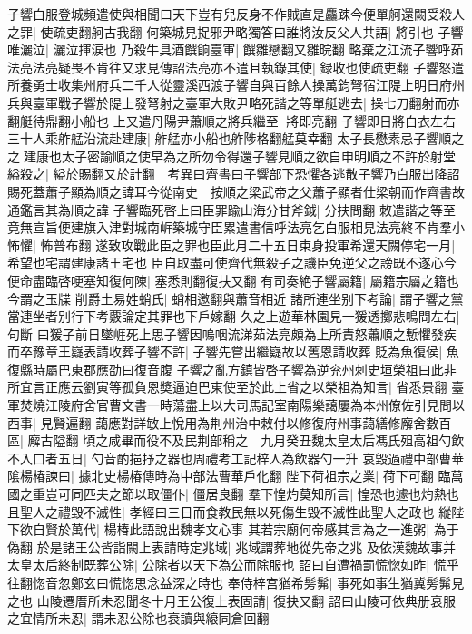 子響白服登城頻遣使與相聞曰天下豈有兒反身不作賊直是麤踈今便單舸還闕受殺人之罪|{
	使疏吏翻舸古我翻}
何築城見捉邪尹略獨答曰誰將汝反父人共語|{
	將引也}
子響唯灑泣|{
	灑泣揮涙也}
乃殺牛具酒饌餉臺軍|{
	饌雛戀翻又雛晥翻}
略棄之江流子響呼茹法亮法亮疑畏不肯往又求見傳詔法亮亦不遣且執錄其使|{
	録收也使疏吏翻}
子響怒遣所養勇士收集州府兵二千人從靈溪西渡子響自與百餘人操萬鈞弩宿江隄上明日府州兵與臺軍戰子響於隄上發弩射之臺軍大敗尹略死諧之等單艇逃去|{
	操七刀翻射而亦翻艇待鼎翻小船也}
上又遣丹陽尹蕭順之將兵繼至|{
	將即亮翻}
子響即日將白衣左右三十人乘舴艋沿流赴建康|{
	舴艋亦小船也舴陟格翻艋莫幸翻}
太子長懋素忌子響順之之建康也太子密諭順之使早為之所勿令得還子響見順之欲自申明順之不許於射堂縊殺之|{
	縊於賜翻又於計翻　考異曰齊書曰子響部下恐懼各逃散子響乃白服出降詔賜死蓋蕭子顯為順之諱耳今從南史　按順之梁武帝之父蕭子顯者仕梁朝而作齊書故通鑑言其為順之諱}
子響臨死啓上曰臣罪踰山海分甘斧鉞|{
	分扶問翻}
敇遣諧之等至竟無宣旨便建旗入津對城南㟁築城守臣累遣書信呼法亮乞白服相見法亮終不肯羣小怖懼|{
	怖普布翻}
遂致攻戰此臣之罪也臣此月二十五日束身投軍希還天闕停宅一月|{
	希望也宅謂建康諸王宅也}
臣自取盡可使齊代無殺子之譏臣免逆父之謗既不遂心今便命盡臨啓哽塞知復何陳|{
	塞悉則翻復扶又翻}
有司奏絶子響屬籍|{
	屬籍宗屬之籍也今謂之玉牒}
削爵土易姓蛸氏|{
	蛸相邀翻與蕭音相近}
諸所連坐别下考論|{
	謂子響之黨當連坐者别行下考覈論定其罪也下戶嫁翻}
久之上遊華林園見一猨透擲悲鳴問左右|{
	句斷}
曰猨子前日墜崕死上思子響因嗚咽流涕茹法亮頗為上所責怒蕭順之慙懼發疾而卒豫章王嶷表請收葬子響不許|{
	子響先嘗出繼嶷故以舊恩請收葬}
貶為魚復侯|{
	魚復縣時屬巴東郡應劭曰復音腹}
子響之亂方鎮皆啓子響為逆兖州刺史垣榮祖曰此非所宜言正應云劉寅等孤負恩奬逼迫巴東使至於此上省之以榮祖為知言|{
	省悉景翻}
臺軍焚燒江陵府舍官曹文書一時蕩盡上以大司馬記室南陽樂藹屢為本州僚佐引見問以西事|{
	見賢遍翻}
藹應對詳敏上悅用為荆州治中敕付以修復府州事藹繕修廨舍數百區|{
	廨古隘翻}
頃之咸畢而役不及民荆部稱之　九月癸丑魏太皇太后馮氏殂高祖勺飲不入口者五日|{
	勺音酌挹抒之器也周禮考工記梓人為飲器勺一升}
哀毀過禮中部曹華隂楊椿諫曰|{
	據北史楊椿傳時為中部法曹華戶化翻}
陛下荷祖宗之業|{
	荷下可翻}
臨萬國之重豈可同匹夫之節以取僵仆|{
	僵居良翻}
羣下惶灼莫知所言|{
	惶恐也遽也灼熱也}
且聖人之禮毀不滅性|{
	孝經曰三日而食教民無以死傷生毁不滅性此聖人之政也}
縱陛下欲自賢於萬代|{
	楊椿此語說出魏孝文心事}
其若宗廟何帝感其言為之一進粥|{
	為于偽翻}
於是諸王公皆詣闕上表請時定兆域|{
	兆域謂葬地從先帝之兆}
及依漢魏故事并太皇太后終制既葬公除|{
	公除者以天下為公而除服也}
詔曰自遭禍罰慌惚如昨|{
	慌乎往翻惚音忽鄭玄曰慌惚思念益深之時也}
奉侍梓宫猶希髣髴|{
	事死如事生猶冀髣髴見之也}
山陵遷厝所未忍聞冬十月王公復上表固請|{
	復抉又翻}
詔曰山陵可依典册衰服之宜情所未忍|{
	謂未忍公除也衰讀與縗同倉回翻}
